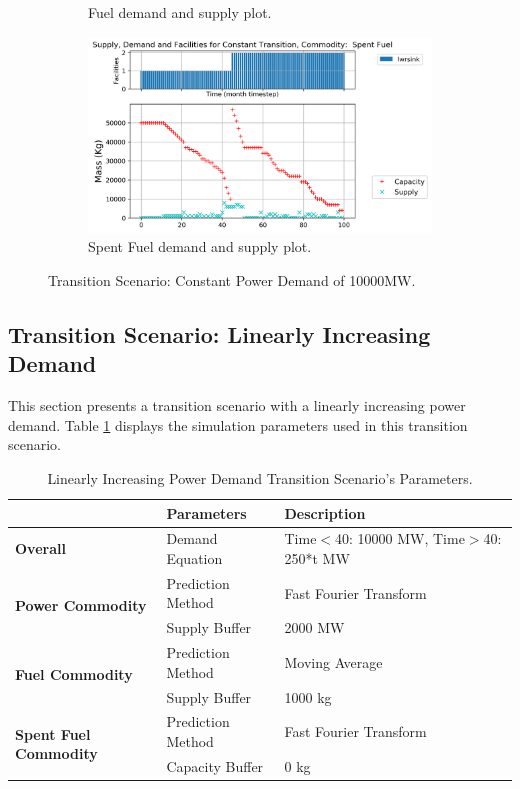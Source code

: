 \documentclass[11pt,letterpaper]{article}
\begin{document}
\begin{figure}[!htbp]
\begin{subfigure}[t]{0.45\textwidth}
        \caption{Fuel demand and supply plot.}
	    \label{fig:constanttransition-fuel}
    \end{subfigure}
    \hfill
    \begin{subfigure}[t]{0.45\textwidth}
        \centering
        \includegraphics[width=\linewidth]{figures/constanttransition-spentfuel.png} 
        \caption{Spent Fuel demand and supply plot.}
        \label{fig:constanttransition-spentfuel}
    \end{subfigure}
    \caption{Transition Scenario: Constant Power Demand of 10000MW.}
\end{figure}

\subsection{Transition Scenario: Linearly Increasing Demand}

This section presents a transition scenario with a linearly 
increasing power demand. 
Table \ref{tab:transition-scenario-growing-power} displays the 
simulation parameters used in this transition scenario. 

\begin{table}[!htbp]
	\centering
	\caption {Linearly Increasing Power Demand Transition Scenario's Parameters.}
	\label{tab:transition-scenario-growing-power}
	\begin{tabular}{|l|l|p{4.1cm}|}
		\hline
		& \textbf{Parameters}    & \textbf{Description} \\ \hline
		\textbf{Overall}& Demand Equation & Time$<$40: 10000 MW, Time$>$40: 250*t MW \\ \hline
		\multirow{2}{*}{\textbf{Power Commodity}} & Prediction Method      &  Fast Fourier Transform \\ \cline{2-3} 
		& Supply Buffer          &  2000 MW \\ \hline
		\multirow{2}{*}{\textbf{Fuel Commodity}}  & Prediction Method      &  Moving Average\\ \cline{2-3}
		& Supply Buffer & 1000 kg \\ \hline
		\multirow{2}{*}{\textbf{Spent Fuel Commodity}}  & Prediction Method      &  Fast Fourier Transform \\ \cline{2-3}
		& Capacity Buffer & 0 kg \\ \hline
	\end{tabular}
\end{table}
\end{document}

